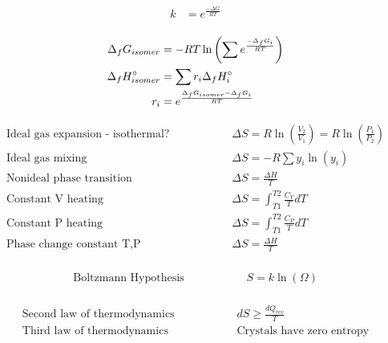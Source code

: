 \documentclass[10pt]{article} %
\begin{document}
\begin{align*}
  k &= e^{\frac{-\Delta G}{RT}}\\
\end{align*}

\begin{align*}
  \Delta_f G_{isomer} &= -RT\ln\left(\sum e^{\frac{-\Delta_f G_i}{RT}}\right)\\
  \Delta_f H_{isomer}\degree &= \sum r_i \Delta_f H_i\degree\\
  r_i &= e^{\frac{\Delta_f G_{isomer} - \Delta_f G_i}{RT}}\\
\end{align*}

\begin{align*}
  \mbox{Ideal gas expansion - isothermal?}&\hspace{2cm}\Delta S = R\ln(\frac{V_2}{V_1}) = R\ln(\frac{P_1}{P_2})\\
  \mbox{Ideal gas mixing}&\hspace{2cm}\Delta S = -R\sum y_i\ln(y_i)\\
  \mbox{Nonideal phase transition}&\hspace{2cm} \Delta S = \frac{\Delta H}{T}\\
  \mbox{Constant V heating}&\hspace{2cm} \Delta S = \int_{T1}^{T2} \frac{C_V}{T}dT\\
  \mbox{Constant P heating}&\hspace{2cm} \Delta S = \int_{T1}^{T2} \frac{C_P}{T}dT\\
  \mbox{Phase change constant T,P}&\hspace{2cm} \Delta S = \frac{\Delta H}{T}\\
\end{align*}

\begin{align*}
  \mbox{Boltzmann Hypothesis}&\hspace{2cm} S = k\ln(\Omega)\\
\end{align*}

\begin{align*}
  \mbox{Second law of thermodynamics}&\hspace{2cm} dS \geq \frac{dQ_{rev}}{T}\\
  \mbox{Third law of thermodynamics}&\hspace{2cm}\mbox{Crystals have zero entropy}\\
\end{align*}
\end{document}
